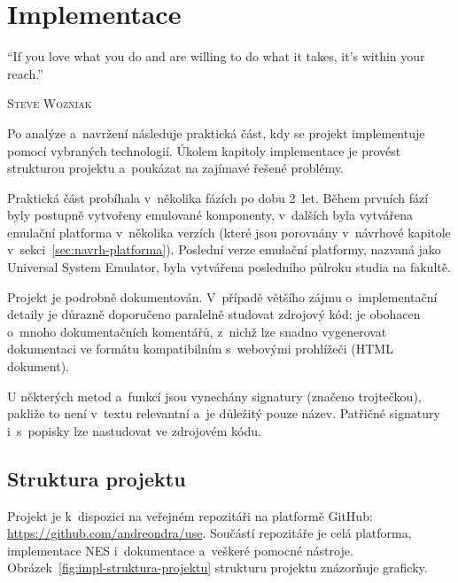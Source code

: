 \chapter{Implementace}
\epigraph{
	\enquote{If you love what you do and are willing to do what it takes, it's within your reach.}
}{\textsc{Steve Wozniak}}

Po analýze a~navržení následuje praktická část, kdy se projekt implementuje pomocí vybraných technologií. 
Úkolem kapitoly implementace je provést strukturou projektu a~poukázat na zajímavé řešené problémy.

Praktická část probíhala v~několika fázích po dobu 2~let. Během prvních fází byly postupně vytvořeny emulované komponenty, v~dalších byla vytvářena emulační platforma v~několika verzích (které jsou porovnány v~návrhové kapitole v~sekci~\ref{sec:navrh-platforma}). Poslední verze emulační platformy, nazvaná jako Universal System Emulator, byla vytvářena posledního půlroku studia na fakultě.

Projekt je podrobně dokumentován. V~případě většího zájmu o~implementační detaily je důrazně doporučeno paralelně studovat zdrojový kód; je obohacen o~mnoho dokumentačních komentářů, z~nichž lze snadno vygenerovat dokumentaci ve formátu kompatibilním s~webovými prohlížeči (HTML dokument).

\begin{note}
	U některých metod a~funkcí jsou vynechány signatury (značeno trojtečkou), pakliže to není v~textu relevantní a~je důležitý pouze název. Patřičné signatury i~s~popisky lze nastudovat ve zdrojovém kódu.
\end{note}

\section{Struktura projektu}
Projekt je k~dispozici na veřejném repozitáři na platformě GitHub: \url{https://github.com/andreondra/use}. Součástí repozitáře je celá platforma, implementace NES i~dokumentace a~veškeré pomocné nástroje. Obrázek~\ref{fig:impl-struktura-projektu} strukturu projektu znázorňuje graficky.

